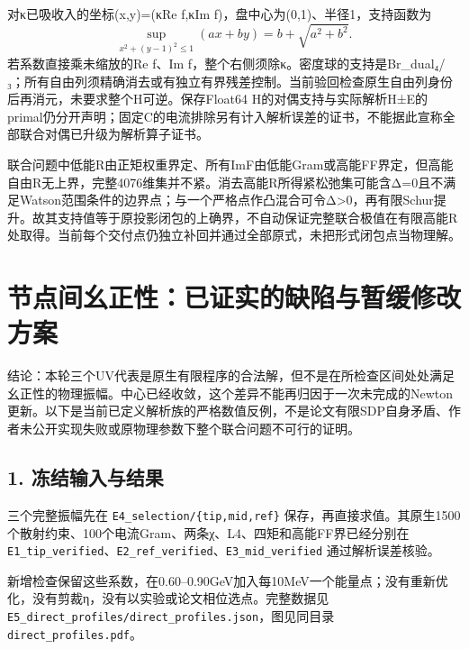 \documentclass[
  11pt,
  a4paper,
]{article}
\begin{document}
对κ已吸收入的坐标(x,y)=(κRe f,κIm f)，盘中心为(0,1)、半径1，支持函数为
\[
\sup_{x^2+(y-1)^2\le1}(a x+b y)=b+\sqrt{a^2+b^2}.
\] 若系数直接乘未缩放的Re f、Im
f，整个右侧须除κ。密度球的支持是B\textbar\textbar r\_dual\textbar\textbar₄/₃；所有自由列须精确消去或有独立有界残差控制。当前验回检查原生自由列身份后再消元，未要求整个H可逆。保存Float64
H的对偶支持与实际解析H±E的primal仍分开声明；固定C的电流排除另有计入解析误差的证书，不能据此宣称全部联合对偶已升级为解析算子证书。

联合问题中低能R由正矩权重界定、所有ImF由低能Gram或高能FF界定，但高能自由R无上界，完整4076维集并不紧。消去高能R所得紧松弛集可能含Δ=0且不满足Watson范围条件的边界点；与一个严格点作凸混合可令Δ\textgreater0，再有限Schur提升。故其支持值等于原投影闭包的上确界，不自动保证完整联合极值在有限高能R处取得。当前每个交付点仍独立补回并通过全部原式，未把形式闭包点当物理解。

\clearpage

\section{节点间幺正性：已证实的缺陷与暂缓修改方案}\label{ux8282ux70b9ux95f4ux5e7aux6b63ux6027ux5df2ux8bc1ux5b9eux7684ux7f3aux9677ux4e0eux6682ux7f13ux4feeux6539ux65b9ux6848}

结论：本轮三个UV代表是原生有限程序的合法解，但不是在所检查区间处处满足幺正性的物理振幅。中心已经收敛，这个差异不能再归因于一次未完成的Newton更新。以下是当前已定义解析族的严格数值反例，不是论文有限SDP自身矛盾、作者未公开实现失败或原物理参数下整个联合问题不可行的证明。

\subsection{1.
冻结输入与结果}\label{ux51bbux7ed3ux8f93ux5165ux4e0eux7ed3ux679c}

三个完整振幅先在 \texttt{E4\_selection/\{tip,mid,ref\}}
保存，再直接求值。其原生1500个散射约束、100个电流Gram、两条χ、L4、四矩和高能FF界已经分别在
\texttt{E1\_tip\_verified}、\texttt{E2\_ref\_verified}、\texttt{E3\_mid\_verified}
通过解析误差核验。

新增检查保留这些系数，在0.60--0.90GeV加入每10MeV一个能量点；没有重新优化，没有剪裁η，没有以实验或论文相位选点。完整数据见
\texttt{E5\_direct\_profiles/direct\_profiles.json}，图见同目录
\texttt{direct\_profiles.pdf}。
\end{document}
